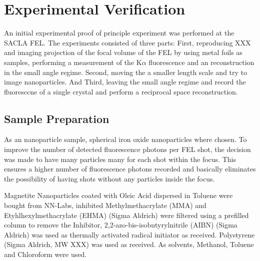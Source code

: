 \chapter{Experimental Verification}
An initial experimental proof of principle experiment was performed at the SACLA FEL.
The experiments consisted of three parts: First, reproducing XXX and imaging projection of the focal volume of the FEL by using metal foils as samples, performing a measurement of the K$\alpha$  fluorescence and an reconstruction in the small angle regime. Second, moving the a smaller length scale and try to image nanoparticles. And Third, leaving the small angle regime and record the fluoresccne of a single crystal and perform a reciprocal space reconstruction.
\section{Sample Preparation}
As an nanoparticle sample, spherical iron oxide nanoparticles where chosen. To improve the number of detected fluorescence photons per FEL shot, the decision was made to have many particles many for each shot within the focus. This ensures a higher number of fluorescence photons recorded and basically eliminates the possibility of having shots without any particles inside the focus. 

Magnetite Nanoparticles coated with Oleic Acid dispersed in Toluene were bought from NN-Labs, inhibited Methylmethacrylate (MMA) and Etyhlhexylmethacrylate (EHMA)  (Sigma Aldrich) were filtered using a prefilled column to remove the Inhibitor,  2,2-azo-bis-isobutyrylnitrile (AIBN) (Sigma Aldrich) was used as thermally activated radical initiator as received. Polystyrene (Sigma Aldrich, MW XXX) was used as received. As solvents, Methanol, Toluene and Chloroform were used.
